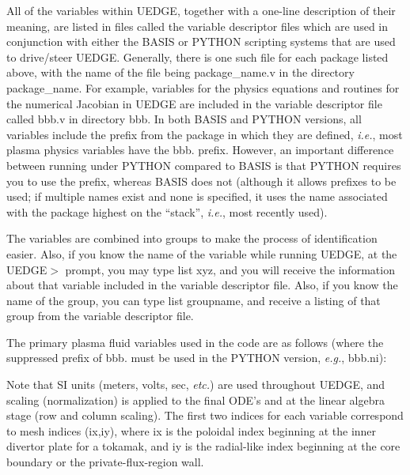 \documentclass [12pt]{article}
\def\hsa{\hskip.4truein}
\def\hsp6{\hskip.6truein}
\begin{document}
All of the variables within {\sf UEDGE}, together with a one-line description
of their meaning, are listed in files called the variable descriptor files
which are used in conjunction with either the {\sf BASIS} or {\sf PYTHON}
scripting systems that are used to drive/steer {\sf UEDGE}.  Generally, there
is one such file for each package listed above, with the name of the file
being {\sf package\_name.v} in the directory {\sf package\_name}.  For
example, variables for the physics equations and routines for the numerical
Jacobian in {\sf UEDGE} are included in the variable descriptor file called
{\sf bbb.v} in directory {\sf bbb}. In both {\sf BASIS} and {\sf PYTHON}
versions, all variables include the prefix from the package in which they are
defined, {\it i.e.}, most plasma physics variables have the {\sf bbb.} prefix.
However, an important difference between running under {\sf PYTHON} compared
to {\sf BASIS} is that {\sf PYTHON} requires you to use the prefix, whereas
{\sf BASIS} does not (although it allows prefixes to be used; if multiple
names exist and none is specified, it uses the name associated with the
package highest on the ``stack'', {\it i.e.}, most recently used).

The variables are combined into groups to make the process of identification
easier.  Also, if you know the name of the variable while running {\sf UEDGE},
at the {\sf UEDGE$>$} prompt, you may type {\sf list xyz}, and you will
receive the information about that variable included in the variable
descriptor file.  Also, if you know the name of the group, you can type {\sf
list groupname}, and receive a listing of that group from the variable
descriptor file.

The primary plasma fluid variables used in the code are as follows (where the
suppressed prefix of {\sf bbb.} must be used in the {\sf PYTHON} version, {\it
e.g.}, bbb.ni): 
{\sf
{}
} 
%
Note that SI units (meters, volts, sec, {\it etc.}) are used throughout {\sf
UEDGE}, and scaling (normalization) is applied to the final ODE's and at the
linear algebra stage (row and column scaling). The first two indices for each
variable correspond to mesh indices {\sf (ix,iy)}, where {\sf ix} is the
poloidal index beginning at the inner divertor plate for a tokamak, and {\sf
iy} is the radial-like index beginning at the core boundary or the
private-flux-region wall.
\end{document}
